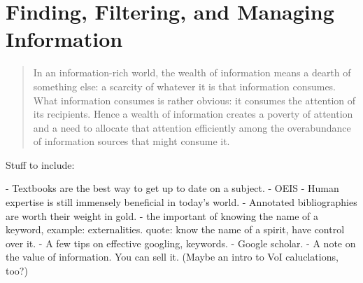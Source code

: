 \chapter{Finding, Filtering, and Managing Information}
\begin{quote}
  In an information-rich world, the wealth of information means a dearth of something else: a scarcity of whatever it is that information consumes. What information consumes is rather obvious: it consumes the attention of its recipients. Hence a wealth of information creates a poverty of attention and a need to allocate that attention efficiently among the overabundance of information sources that might consume it.
\end{quote}

Stuff to include:

- Textbooks are the best way to get up to date on a subject.
- OEIS
- Human expertise is still immensely beneficial in today's world.
- Annotated bibliographies are worth their weight in gold.
- the important of knowing the name of a keyword, example: externalities. quote: know the name of a spirit, have control over it.
- A few tips on effective googling, keywords.
- Google scholar.
- A note on the value of information. You can sell it. (Maybe an intro to VoI caluclations, too?)
